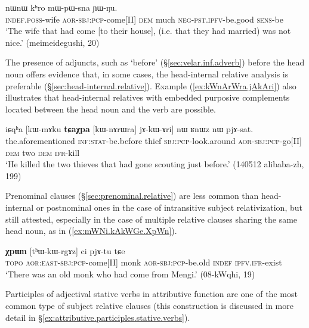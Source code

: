 \begin{exe}
\ex \label{ex:tArZaB.jAkWGe}
 nɯnɯ kʰro mɯ-pɯ-sna ɲɯ-ŋu.  \\
\textsc{indef}.\textsc{poss}-wife \textsc{aor}-\textsc{sbj}:\textsc{pcp}-come[II] \textsc{dem} much \textsc{neg}-\textsc{pst}.\textsc{ipfv}-be.good \textsc{sens}-be \\
\glt `The wife that had come [to their house], (i.e. that they had married) was not nice.' (meimeidegushi, 20)
\end{exe} 

The presence of adjuncts, such as  `before' (§\ref{sec:velar.inf.adverb}) before the head noun offers evidence that, in some cases, the head-internal relative analysis is preferable (§\ref{sec:head-internal.relative}). Example (\ref{ex:kWnArWra.jAkAri}) also illustrates that head-internal relatives with embedded purposive complements located between the head noun and the verb are possible.

\begin{exe}
\ex \label{ex:kWnArWra.jAkAri}
\gll iɕqʰa [kɯ-mɤku \textbf{tɕaχpa} [kɯ-nɤrɯra] jɤ-kɯ-ɤri] nɯ ʁnɯz nɯ pjɤ-sat. \\
the.aforementioned \textsc{inf}:\textsc{stat}-be.before thief \textsc{sbj}:\textsc{pcp}-look.around \textsc{aor}-\textsc{sbj}:\textsc{pcp}-go[II]  \textsc{dem} two \textsc{dem} \textsc{ifr}-kill \\
\glt `He killed the two thieves that had gone scouting just before.' (140512 alibaba-zh, 199)
\end{exe} 

Prenominal clauses (§\ref{sec:prenominal.relative}) are less common than head-internal or postnominal ones in the case of intransitive subject relativization, but still attested, especially in the case of multiple relative clauses sharing the same head noun, as in (\ref{ex:mWNi.kAkWGe.XpWn}).
 
\begin{exe}
\ex \label{ex:mWNi.kAkWGe.XpWn}
\gll 	 [mɯŋi kɤ-kɯ-ɣe] \textbf{χpɯn} [tʰɯ-kɯ-rgɤz] ci pjɤ-tu tɕe \\
\textsc{topo} \textsc{aor}:\textsc{east}-\textsc{sbj}:\textsc{pcp}-come[II] monk \textsc{aor}-\textsc{sbj}:\textsc{pcp}-be.old \textsc{indef} \textsc{ipfv}.\textsc{ifr}-exist \\
\glt `There was an old monk who had come from Mengi.' (08-kWqhi, 19)
\end{exe} 

Participles of adjectival stative verbs in attributive function are one of the most common type of subject relative clauses (this construction is discussed in more detail in §\ref{ex:attributive.participles.stative.verbs}).

